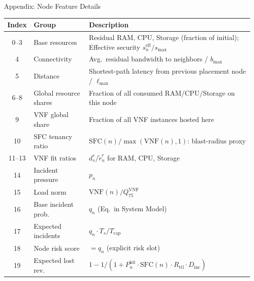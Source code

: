 
\begin{frame}[noframenumbering]{Appendix: Node Feature Details}
  \centering\footnotesize
  \begin{tabular}{clp{6cm}}
    \toprule
    \textbf{Index} & \textbf{Group} & \textbf{Description}\\
    \midrule
    0--3  & Base resources      & Residual RAM, CPU, Storage (fraction of initial); Effective security $s_n^{\text{eff}}/s_{\max}$\\
    4     & Connectivity        & Avg.\ residual bandwidth to neighbors / $b_{\max}$\\
    5     & Distance            & Shortest-path latency from previous placement node / $\ell_{\max}$\\
    6--8  & Global resource shares & Fraction of all consumed RAM/CPU/Storage on this node\\
    9     & VNF global share    & Fraction of all VNF instances hosted here\\
    10    & SFC tenancy ratio   & $\mathrm{SFC}(n)/\max(\mathrm{VNF}(n),1)$: blast-radius proxy\\
    11--13& VNF fit ratios      & $d_v^r / \tilde{r}_n^r$ for RAM, CPU, Storage\\
    14    & Incident pressure   & $p_n$\\
    15    & Load norm           & $\mathrm{VNF}(n)/Q_{75}^{\mathrm{VNF}}$\\
    16    & Base incident prob. & $q_n$ (Eq.\ in System Model)\\
    17    & Expected incidents  & $q_n \cdot T_s / T_{\text{cap}}$\\
    18    & Node risk score     & $= q_n$ (explicit risk slot)\\
    19    & Expected lost rev.  & $1 - 1/(1 + P_n^{\text{hit}}\cdot\mathrm{SFC}(n)\cdot R_{\text{ttl}}\cdot D_{\text{inc}})$\\
    \bottomrule
  \end{tabular}
\end{frame}

